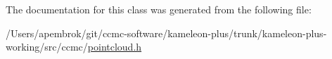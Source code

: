 The documentation for this class was generated from the following file\-:\begin{DoxyCompactItemize}
\item 
/\-Users/apembrok/git/ccmc-\/software/kameleon-\/plus/trunk/kameleon-\/plus-\/working/src/ccmc/\hyperlink{pointcloud_8h}{pointcloud.\-h}\end{DoxyCompactItemize}

